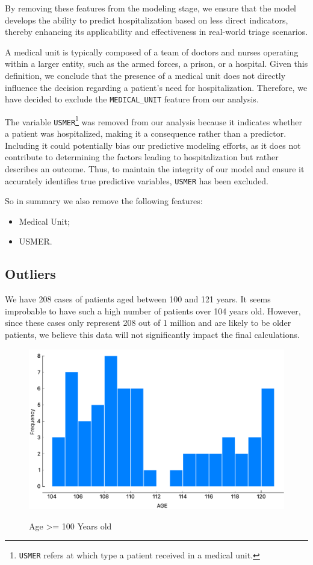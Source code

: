 By removing these features from the modeling stage, we ensure that the 
model develops the ability to predict hospitalization based on less direct
indicators, thereby enhancing its applicability and effectiveness in 
real-world triage scenarios.

A medical unit is typically composed of a team of doctors and nurses operating within a larger 
entity, such as the armed forces, a prison, or a hospital. Given this definition, we conclude that
the presence of a medical unit does not directly influence the decision regarding a patient's need 
for hospitalization. Therefore, we have decided to exclude the \texttt{MEDICAL\_UNIT} feature from 
our analysis.

The variable \texttt{USMER}\footnote{\texttt{USMER} refers at which type a patient
received in a medical unit.} was removed from our analysis because it indicates whether
a patient was hospitalized, making it a consequence rather than a predictor. Including
it could potentially bias our predictive modeling efforts, as it does not contribute
to determining the factors leading to hospitalization but rather describes an outcome.
Thus, to maintain the integrity of our model and ensure it accurately identifies true 
predictive variables, \texttt{USMER} has been excluded.

So in summary we also remove the following features:
\begin{itemize}
    \item Medical Unit;
    \item USMER.
\end{itemize}


\subsection{Outliers}

We have 208 cases of patients aged between 100 and 121 years. It seems 
improbable to have such a high number of patients over 104 years old. However,
since these cases only represent 208 out of 1 million and are likely to be 
older patients, we believe this data will not significantly impact the final 
calculations.

\begin{figure}[H]%
    \caption{Age >= 100 Years old}%
    \label{fig:data_preparation_edit_domain}%
    \centering
    {\includegraphics[width=\textwidth]{img/dataexploration/outliers_age.png} }
\end{figure}


